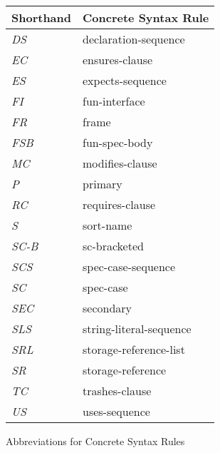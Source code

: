 \begin{BFIGURE}
\begin{center}
\begin{tabular}{|l| |l|}
Shorthand & Concrete Syntax Rule \\
\hline
\mbox{\textit{DS}} & declaration-sequence \\
\mbox{\textit{EC}} & ensures-clause \\
\mbox{\textit{ES}} & expects-sequence \\
\mbox{\textit{FI}} & fun-interface \\
\mbox{\textit{FR}} & frame \\
\mbox{\textit{FSB}} & fun-spec-body \\
\mbox{\textit{MC}} & modifies-clause \\
\mbox{\textit{P}} & primary \\
\mbox{\textit{RC}} & requires-clause \\
\mbox{\textit{S}} & sort-name \\
\mbox{\textit{SC-B}} & sc-bracketed \\
\mbox{\textit{SCS}} & spec-case-sequence \\
\mbox{\textit{SC}} & spec-case \\
\mbox{\textit{SEC}} & secondary \\
\mbox{\textit{SLS}} & string-literal-sequence \\
\mbox{\textit{SRL}} & storage-reference-list \\
\mbox{\textit{SR}} & storage-reference \\
\mbox{\textit{TC}} & trashes-clause \\
\mbox{\textit{US}} & uses-sequence \\
\end{tabular}
\end{center}
\caption{Abbreviations for Concrete Syntax Rules}
\label{abb-fig}
\end{BFIGURE}

